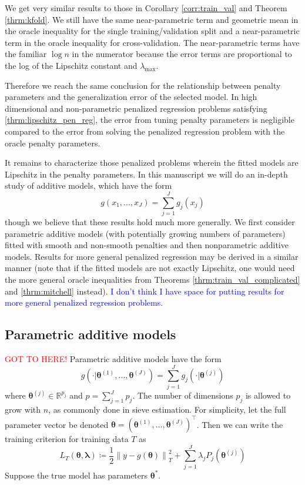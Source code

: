 \documentclass[12pt]{article}
\begin{document}
We get very similar results to those in Corollary \ref{corr:train_val} and Theorem \ref{thrm:kfold}. We still have the same near-parametric term and geometric mean in the oracle inequality for the single training/validation split and a near-parametric term in the oracle inequality for cross-validation. The near-parametric terms have the familiar $\log n$ in the numerator because the error terms are proportional to the log of the Lipschitz constant and $\lambda_{\max}$. 

Therefore we reach the same conclusion for the relationship between penalty parameters and the generalization error of the selected model. In high dimensional and non-parametric penalized regression problems satisfying \eqref{thrm:lipschitz_pen_reg}, the error from tuning penalty parameters is negligible compared to the error from solving the penalized regression problem with the oracle penalty parameters.

It remains to characterize those penalized problems wherein the fitted models are Lipschitz in the penalty parameters. In this manuscript we will do an in-depth study of additive models, which have the form
\begin{equation}
g(x_1, ..., x_J)= \sum_{j=1}^J g_j(x_j)
\end{equation}
though we believe that these results hold much more generally. We first consider parametric additive models (with potentially growing numbers of parameters) fitted with smooth and non-smooth penalties and then nonparametric additive models. Results for more general penalized regression may be derived in a similar manner (note that if the fitted models are not exactly Lipschitz, one would need the more general oracle inequalities from Theorems \ref{thrm:train_val_complicated} and \ref{thrm:mitchell} instead). \textcolor{blue}{I don't think I have space for putting results for more general penalized regression problems.}

\subsection{Parametric additive models}
\label{sec:param_add_models}
\textcolor{red}{GOT TO HERE!} Parametric additive models have the form
\begin{equation}
g(\cdot | \boldsymbol{\theta}^{(1)}, ..., \boldsymbol{\theta}^{(J)}) = \sum_{j=1}^J g_j(\cdot | \boldsymbol{\theta}^{(j)})
\end{equation}
where $\boldsymbol{\theta}^{(j)} \in \mathbb{R}^{p_j}$ and $p = \sum_{j=1}^J p_j$. The number of dimensions $p_j$ is allowed to grow with $n$, as commonly done in sieve estimation. For simplicity, let the full parameter vector be denoted $\boldsymbol{\theta} = \left (\boldsymbol{\theta}^{(1)}, ..., \boldsymbol{\theta}^{(J)} \right )^\top$. Then we can write the training criterion for training data $T$ as
\begin{equation}
\label{eq:param_add}
L_T \left (\boldsymbol{\theta}, \boldsymbol{\lambda} \right) 
\coloneqq \frac{1}{2} \left  \| y -  g(\boldsymbol{\theta}) \right \|^2_T 
+ \sum_{j=1}^J \lambda_j P_j(\boldsymbol{\theta}^{(j)})
\end{equation}
Suppose the true model has parameters $\boldsymbol{\theta}^*$.
\end{document}
